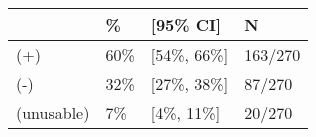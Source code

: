 \begin{tabular}{llll}
\hline
& \% & [95\% CI]  & N \\
\hline
(+) & 60\% & [54\%, 66\%] & 163/270\\
(-) & 32\% & [27\%, 38\%] & 87/270\\
(unusable) & 7\% & [4\%, 11\%] & 20/270\\
\hline
\end{tabular}
